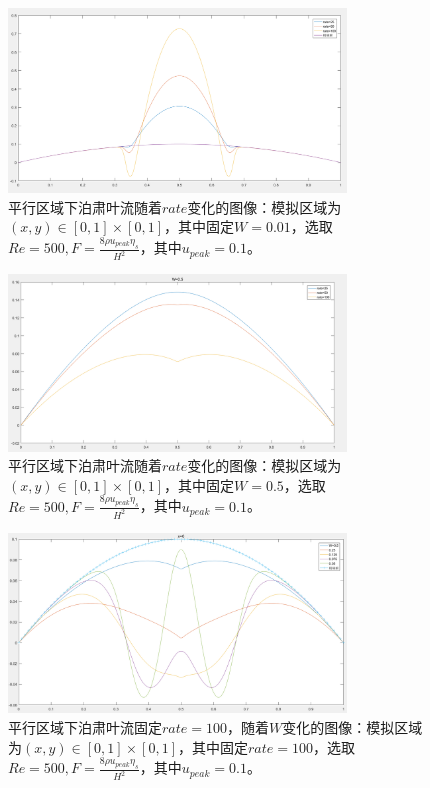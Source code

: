 \documentclass[11pt,UTF8]{ctexart}
\begin{document}
    \begin{figure}[h]
        \centerline{\includegraphics[width=0.8\textwidth]{Poiseuille_rate_W_0_01.png}}
        \caption{平行区域下泊肃叶流随着$rate$变化的图像：模拟区域为$(x,y)\in [0,1]\times [0,1]$，其中固定$W=0.01$，选取$Re=500,F=\frac{8\rho u_{peak} \eta_s}{H^2}$，其中$u_{peak}=0.1$。}
        \label{img6}
    \end{figure}
    \begin{figure}[h]
        \centerline{\includegraphics[width=0.8\textwidth]{Poiseuille_rate_W_0_5.png}}
        \caption{平行区域下泊肃叶流随着$rate$变化的图像：模拟区域为$(x,y)\in [0,1]\times [0,1]$，其中固定$W=0.5$，选取$Re=500,F=\frac{8\rho u_{peak} \eta_s}{H^2}$，其中$u_{peak}=0.1$。}
        \label{img7}
    \end{figure}
    \begin{figure}[h]
        \centerline{\includegraphics[width=0.8\textwidth]{check_rate_100.PNG}}
        \caption{平行区域下泊肃叶流固定$rate=100$，随着$W$变化的图像：模拟区域为$(x,y)\in [0,1]\times [0,1]$，其中固定$rate=100$，选取$Re=500,F=\frac{8\rho u_{peak} \eta_s}{H^2}$，其中$u_{peak}=0.1$。}
        \label{img27}
    \end{figure}
\end{document}
